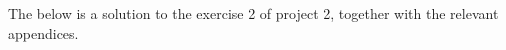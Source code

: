 \documentclass[a4paper]{article}
\begin{document}
\maketitle
\thispagestyle{first} %

\pagebreak

The below is a solution to the exercise 2 of project 2, together with the
relevant appendices.

\tableofcontents

\setcounter{section}{1}



\appendix


\end{document}
